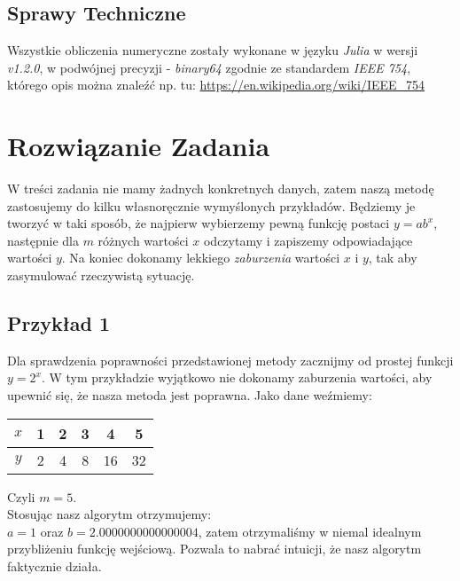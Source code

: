 \documentclass[12pt,a4paper]{article}
\begin{document}
\subsection{Sprawy Techniczne}
Wszystkie obliczenia numeryczne zostały wykonane w języku \textit{Julia} w wersji \textit{v1.2.0}, w podwójnej precyzji - \textit{binary64} zgodnie ze standardem \textit{IEEE 754}, którego opis można znaleźć np. tu: \url{https://en.wikipedia.org/wiki/IEEE_754}

\section{Rozwiązanie Zadania}
W treści zadania nie mamy żadnych konkretnych danych, zatem naszą metodę zastosujemy do kilku własnoręcznie wymyślonych przykładów. Będziemy je tworzyć w taki sposób, że najpierw wybierzemy pewną funkcję postaci $y=ab^x$, następnie dla $m$ różnych wartości $x$ odczytamy i zapiszemy odpowiadające wartości $y$. Na koniec dokonamy lekkiego \textit{zaburzenia} wartości $x$ i $y$, tak aby zasymulować rzeczywistą sytuację.

\subsection{Przykład 1}
Dla sprawdzenia poprawności przedstawionej metody zacznijmy od prostej funkcji $y=2^x$. W tym przykładzie wyjątkowo nie dokonamy zaburzenia wartości, aby upewnić się, że nasza metoda jest poprawna. Jako dane weźmiemy:
\begin{center}
	\begin{tabular}{|c|c|c|c|c|c|} \hline
	$x$ & 1 & 2 & 3 & 4 & 5   \\ \hline
	$y$ & 2 & 4 & 8 & 16& 32  \\ \hline
	\end{tabular}
\end{center}
Czyli $m=5$.\\
Stosując nasz algorytm otrzymujemy:\\
$a = 1$ oraz $b = 2.0000000000000004$, zatem otrzymaliśmy w niemal idealnym przybliżeniu funkcję wejściową. Pozwala to nabrać intuicji, że nasz algorytm faktycznie działa.
\end{document}
